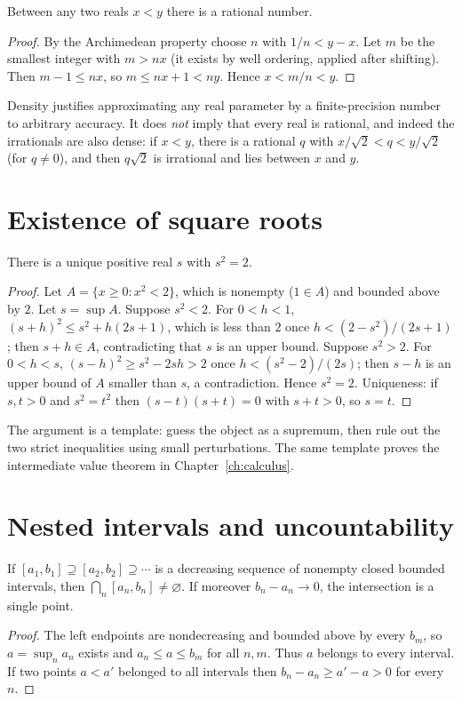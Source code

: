 \begin{theorem}
Between any two reals $x<y$ there is a rational number.
\end{theorem}
\begin{proof}
By the Archimedean property choose $n$ with $1/n<y-x$. Let $m$ be the smallest integer with $m>nx$ (it exists by well ordering, applied after shifting). Then $m-1\le nx$, so $m\le nx+1<ny$. Hence $x<m/n<y$.
\end{proof}
Density justifies approximating any real parameter by a finite-precision number to arbitrary accuracy. It does \emph{not} imply that every real is rational, and indeed the irrationals are also dense: if $x<y$, there is a rational $q$ with $x/\sqrt2<q<y/\sqrt2$ (for $q\ne0$), and then $q\sqrt2$ is irrational and lies between $x$ and $y$.

\section{Existence of square roots}
\begin{theorem}
There is a unique positive real $s$ with $s^2=2$.
\end{theorem}
\begin{proof}
Let $A=\{x\ge0:x^2<2\}$, which is nonempty ($1\in A$) and bounded above by $2$. Let $s=\sup A$. Suppose $s^2<2$. For $0<h<1$, $(s+h)^2\le s^2+h(2s+1)$, which is less than $2$ once $h<(2-s^2)/(2s+1)$; then $s+h\in A$, contradicting that $s$ is an upper bound. Suppose $s^2>2$. For $0<h<s$, $(s-h)^2\ge s^2-2sh>2$ once $h<(s^2-2)/(2s)$; then $s-h$ is an upper bound of $A$ smaller than $s$, a contradiction. Hence $s^2=2$. Uniqueness: if $s,t>0$ and $s^2=t^2$ then $(s-t)(s+t)=0$ with $s+t>0$, so $s=t$.
\end{proof}
The argument is a template: guess the object as a supremum, then rule out the two strict inequalities using small perturbations. The same template proves the intermediate value theorem in Chapter~\ref{ch:calculus}.

\section{Nested intervals and uncountability}
\begin{theorem}
If $[a_1,b_1]\supseteq[a_2,b_2]\supseteq\cdots$ is a decreasing sequence of nonempty closed bounded intervals, then $\bigcap_n[a_n,b_n]\ne\varnothing$. If moreover $b_n-a_n\to0$, the intersection is a single point.
\end{theorem}
\begin{proof}
The left endpoints are nondecreasing and bounded above by every $b_m$, so $a=\sup_na_n$ exists and $a_n\le a\le b_m$ for all $n,m$. Thus $a$ belongs to every interval. If two points $a<a'$ belonged to all intervals then $b_n-a_n\ge a'-a>0$ for every $n$.
\end{proof}

